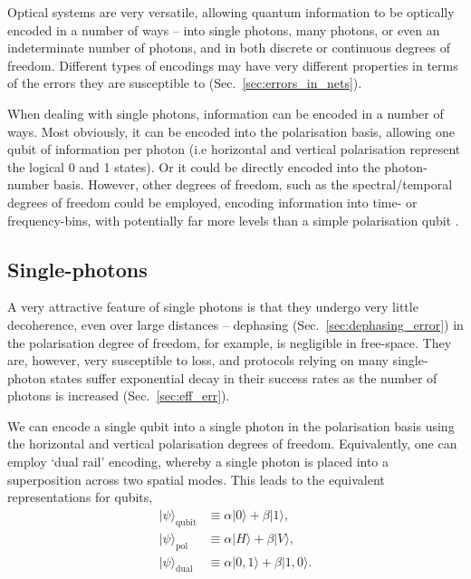 \documentclass[aps,rmp,twocolumn,amsmath,amssymb,nofootinbib,superscriptaddress,longbibliography,floatfix]{revtex4-1}
\newcommand{\ket}[1]{|#1\rangle}
\begin{document}
Optical systems are very versatile, allowing quantum information to be optically encoded in a number of ways -- into single photons, many photons, or even an indeterminate number of photons, and in both discrete or continuous degrees of freedom. Different types of encodings may have very different properties in terms of the errors they are susceptible to (Sec.~\ref{sec:errors_in_nets}).

When dealing with single photons, information can be encoded in a number of ways. Most obviously, it can be encoded into the polarisation basis, allowing one qubit of information per photon (i.e horizontal and vertical polarisation represent the logical 0 and 1 states). Or it could be directly encoded into the photon-number basis. However, other degrees of freedom, such as the spectral/temporal degrees of freedom could be employed, encoding information into time- or frequency-bins, with potentially far more levels than a simple polarisation qubit \cite{bib:RohdeInfCap13}.

%
%

\subsection{Single-photons} \label{sec:single_phot_enc}

A very attractive feature of single photons is that they undergo very little decoherence, even over large distances -- dephasing (Sec.~\ref{sec:dephasing_error}) in the polarisation degree of freedom, for example, is negligible in free-space. They are, however, very susceptible to loss, and protocols relying on many single-photon states suffer exponential decay in their success rates as the number of photons is increased (Sec.~\ref{sec:eff_err}).

We can encode a single qubit into a single photon in the polarisation basis using the horizontal and vertical polarisation degrees of freedom. Equivalently, one can employ `dual rail' encoding, whereby a single photon is placed into a superposition across two spatial modes. This leads to the equivalent representations for qubits,
\begin{align} \label{eq:single_photon_enc}
\ket{\psi}_\mathrm{qubit} &\equiv \alpha\ket{0} + \beta\ket{1}, \nonumber \\
\ket{\psi}_\mathrm{pol} &\equiv \alpha\ket{H} + \beta\ket{V}, \nonumber \\
\ket{\psi}_\mathrm{dual} &\equiv \alpha\ket{0,1} + \beta\ket{1,0}.
\end{align}
\end{document}
